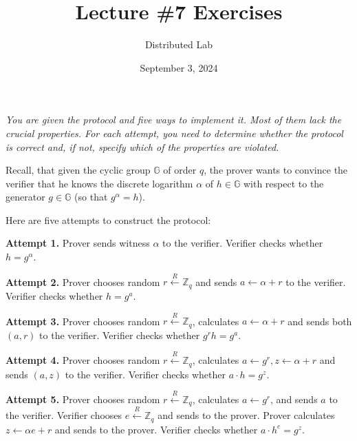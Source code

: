 \documentclass{zkdl-tests-template}
\title{\huge\sffamily\bfseries Lecture \#7 Exercises}
\author{\Large\sffamily Distributed Lab}
\date{\sffamily September 3, 2024}
\begin{document}
\pagestyle{fancy}

\maketitle

\begin{tcolorbox}[colback=gray!10!white,fonttitle=\bfseries,colframe=purple!80!black,title=Exercises 1-5. In search of correct Schnorr's Identification Protocol\ldots]
    \textit{You are given the protocol and five ways to implement it. Most of them lack the crucial properties. For each attempt, you need to determine whether the protocol is correct and, if not, specify which of the properties are violated.}
    \vspace{10px}
 
    Recall, that given the cyclic group $\mathbb{G}$ of order $q$, the prover wants to convince the verifier that he knows the discrete logarithm $\alpha$ of $h \in \mathbb{G}$ with respect to the generator $g \in \mathbb{G}$ (so that $g^{\alpha}=h$).

    Here are five attempts to construct the protocol:

    \textcolor{purple!80!black}{\textbf{Attempt 1.}} Prover sends witness $\alpha$ to the verifier. Verifier checks whether $h = g^{\alpha}$.

    \textcolor{purple!80!black}{\textbf{Attempt 2.}} Prover chooses random $r \xleftarrow{R} \mathbb{Z}_q$ and sends $a \gets \alpha + r$ to the verifier. Verifier checks whether $h = g^a$.

    \textcolor{purple!80!black}{\textbf{Attempt 3.}} Prover chooses random $r \xleftarrow{R} \mathbb{Z}_q$, calculates $a \gets \alpha + r$ and sends both $(a,r)$ to the verifier. Verifier checks whether $g^r h = g^a$.

    \textcolor{purple!80!black}{\textbf{Attempt 4.}} Prover chooses random $r \xleftarrow{R} \mathbb{Z}_q$, calculates $a \gets g^r, z \gets \alpha+r$ and sends $(a,z)$ to the verifier. Verifier checks whether $a \cdot h = g^z$.

    \textcolor{purple!80!black}{\textbf{Attempt 5.}} Prover chooses random $r \xleftarrow{R} \mathbb{Z}_q$, calculates $a \gets g^r$, and sends $a$ to the verifier. Verifier chooses $e \xleftarrow{R} \mathbb{Z}_q$ and sends to the prover. Prover calculates $z \gets \alpha e + r$ and sends to the prover. Verifier checks whether $a \cdot h^e = g^z$.

    \vspace{10px}


\end{tcolorbox}
\end{document}
